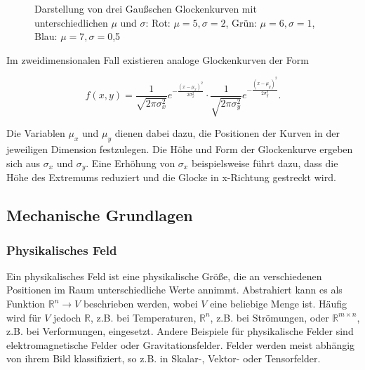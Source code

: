 \documentclass[a4paper,fontsize=12pt,toc=bib,parskip=half,ngerman]{scrartcl}
\begin{document}
\begin{figure}
	\centering
	\caption{Darstellung von drei Gau{\ss}schen Glockenkurven mit unterschiedlichen $\mu$ und $\sigma$: Rot: $\mu=5, \sigma=2$, Gr\"un: $\mu=6, \sigma=1$, Blau: $\mu=7, \sigma=$0,5}
	\label{Gauss}
\end{figure}

Im zweidimensionalen Fall existieren analoge Glockenkurven der Form

\begin{equation}
	f(x,y) = 
	\frac{1}{\sqrt{2\pi \sigma_x^2}}e^{-\frac{(x-\mu_x)^2}{2\sigma_x^2}} \cdot 
	\frac{1}{\sqrt{2\pi \sigma_y^2}}e^{-\frac{(x-\mu_y)^2}{2\sigma_y^2}}.
\end{equation}

Die Variablen $\mu_x$ und $\mu_y$ dienen dabei dazu, die Positionen der Kurven in der jeweiligen Dimension festzulegen. Die H\"ohe und Form der Glockenkurve ergeben sich aus $\sigma_x$ und $\sigma_y$. Eine Erh\"ohung von $\sigma_x$ beispielsweise f\"uhrt dazu, dass die H\"ohe des Extremums reduziert und die Glocke in x-Richtung gestreckt wird.

\subsection{Mechanische Grundlagen}
\subsubsection{Physikalisches Feld}
Ein physikalisches Feld ist eine physikalische Gr\"o{\ss}e, die an verschiedenen Positionen im Raum unterschiedliche Werte annimmt\cite[1–2 Electric and magnetic fields]{feynman2011feynman}. Abstrahiert kann es als Funktion $\mathbb{R}^n \rightarrow V$ beschrieben werden, wobei $V$ eine beliebige Menge ist. H\"aufig wird f\"ur $V$ jedoch $\mathbb{R}$, z.B. bei Temperaturen, $\mathbb{R}^n$, z.B. bei Str\"omungen, oder $\mathbb{R}^{m\times n}$, z.B. bei Verformungen, eingesetzt. Andere Beispiele f\"ur physikalische Felder sind elektromagnetische Felder oder Gravitationsfelder. Felder werden meist abh\"angig von ihrem Bild klassifiziert, so z.B. in Skalar-, Vektor- oder Tensorfelder.
\end{document}
